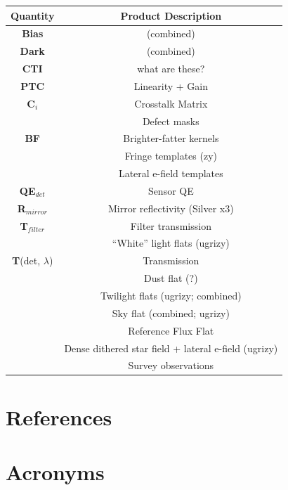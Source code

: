 \documentclass[SE,authoryear,lsstdraft,toc]{lsstdoc}
\begin{document}
\begin{table}[h!]
    \begin{tabular}{|c|c|}
    Quantity & Product Description \\
    \hline \hline
    \textbf{Bias} & (combined) \\
    \hline
    \textbf{Dark} &  (combined) \\
    \hline
    \textbf{CTI} & what are these? \\
    \hline
    \textbf{PTC} & Linearity + Gain \\
    \hline
    \textbf{C$_{i}$} & Crosstalk Matrix \\
    \hline
     & Defect masks \\
    \hline
    \textbf{BF} & Brighter-fatter kernels \\
    \hline
     & Fringe templates (zy) \\
    \hline
     & Lateral e-field templates \\
    \hline
    \textbf{QE$_{det}$} & Sensor QE \\
    \hline
    \textbf{R$_{mirror}$} & Mirror reflectivity (Silver x3) \\
    \hline
    \textbf{T$_{filter}$} & Filter transmission \\
    \hline
     & “White” light flats (ugrizy) \\
    \hline
    \textbf{T}(det, $\lambda$) & Transmission \\
    \hline
     & Dust flat (?) \\
    \hline
     & Twilight flats (ugrizy; combined) \\
    \hline
     & Sky flat (combined; ugrizy) \\
    \hline
     & Reference Flux Flat \\
    \hline
     & Dense dithered star field + lateral e-field (ugrizy) \\
    \hline
     & Survey observations \\
    \hline
    \end{tabular}
\end{table}


\section{References} \label{sec:bib}
\renewcommand{\refname}{} %


\section{Acronyms} \label{sec:acronyms}

\end{document}
